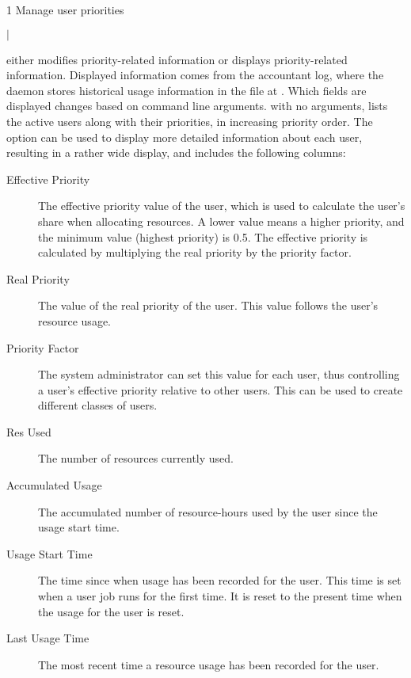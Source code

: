 \begin{ManPage}{\label{man-condor-userprio}}{1}
{Manage user priorities} 

\Synopsis {}

 $|$ 

\Description 
{} either modifies priority-related information
or displays priority-related information.
Displayed information comes from the accountant log,
where the  daemon stores historical usage information
in the file at .
Which fields are displayed changes based on command line arguments.
 with no arguments, 
lists the active users along with their priorities,
in increasing priority order. 
The  option can be used to display
more detailed information about each user, 
resulting in a rather wide display,
and includes the following columns:

\begin{description}
\item[Effective Priority] The effective priority value of the user, 
which is used to calculate the user's share when allocating resources. 
A lower value means a higher priority, 
and the minimum value (highest priority) is 0.5. 
The effective priority is
calculated by multiplying the real priority by the priority factor.
\item[Real Priority] The value of the real priority of the user. 
This value follows the user's resource usage.
\item[Priority Factor] The system administrator can set this value 
for each user, 
thus controlling a user's effective priority relative to other users. 
This can be used to create different classes of users.
\item[Res Used] The number of resources currently used. 
\item[Accumulated Usage] The accumulated number of resource-hours 
used by the user since the usage start time.
\item[Usage Start Time] The time since when usage has been recorded 
for the user. 
This time is set when a user job runs for the first time. 
It is reset to the present time when the
usage for the user is reset.
\item[Last Usage Time] The most recent time a resource usage has been recorded 
for the user.
\end{description}


\end{ManPage}
